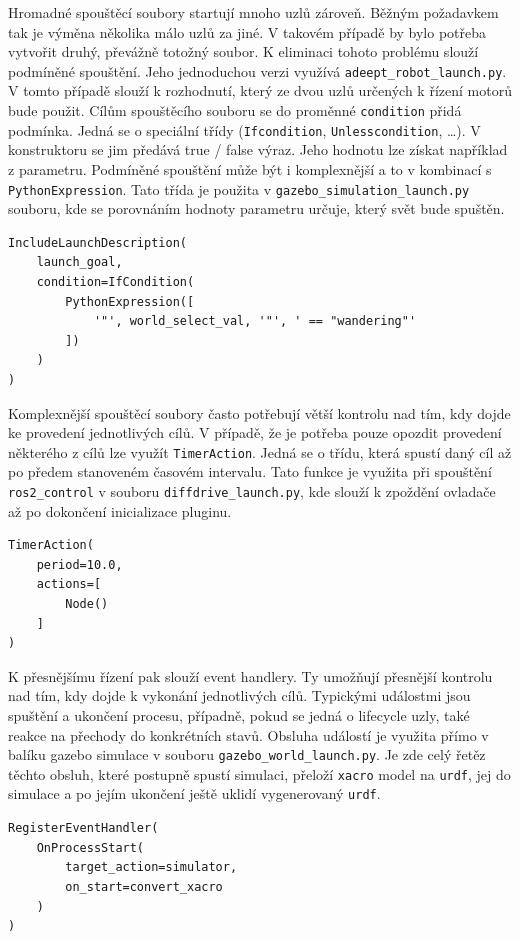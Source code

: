 Hromadné spouštěcí soubory startují mnoho uzlů zároveň. Běžným požadavkem tak je výměna několika málo uzlů za jiné. V takovém případě by bylo potřeba vytvořit druhý, převážně totožný soubor. K eliminaci tohoto problému slouží podmíněné spouštění. Jeho jednoduchou verzi využívá \verb|adeept_robot_launch.py|. V tomto případě slouží k rozhodnutí, který ze dvou uzlů určených k řízení motorů bude použit. Cílům spouštěcího souboru se do proměnné \verb|condition| přidá podmínka. Jedná se o speciální třídy (\verb|Ifcondition|, \verb|Unlesscondition|, \dots). V konstruktoru se jim předává true / false výraz. Jeho hodnotu lze získat například z parametru. Podmíněné spouštění může být i komplexnější a to v kombinací s \verb|PythonExpression|. Tato třída je použita v \verb|gazebo_simulation_launch.py| souboru, kde se porovnáním hodnoty parametru určuje, který svět bude spuštěn.
\begin{verbatim}
IncludeLaunchDescription(
    launch_goal,
    condition=IfCondition(
        PythonExpression([
            '"', world_select_val, '"', ' == "wandering"'
        ])
    )
)
\end{verbatim}

Komplexnější spouštěcí soubory často potřebují větší kontrolu nad tím, kdy dojde ke provedení jednotlivých cílů. V případě, že je potřeba pouze opozdit provedení některého z cílů lze využít \verb|TimerAction|. Jedná se o třídu, která spustí daný cíl až po předem stanoveném časovém intervalu. Tato funkce je využita při spouštění \verb|ros2_control| v souboru \verb|diffdrive_launch.py|, kde slouží k zpoždění  ovladače až po dokončení inicializace pluginu.
\begin{verbatim}
TimerAction(
    period=10.0,
    actions=[
        Node()
    ]
)
\end{verbatim}

K přesnějšímu řízení pak slouží event handlery. Ty umožňují přesnější kontrolu nad tím, kdy dojde k vykonání jednotlivých cílů. Typickými událostmi jsou spuštění a ukončení procesu, případně, pokud se jedná o lifecycle uzly, také reakce na přechody do konkrétních stavů. Obsluha událostí je využita přímo v balíku gazebo simulace v souboru \verb|gazebo_world_launch.py|. Je zde celý řetěz těchto obsluh, které postupně spustí simulaci, přeloží \verb|xacro| model na \verb|urdf|,  jej do simulace a po jejím ukončení ještě uklidí vygenerovaný \verb|urdf|.
\begin{verbatim}
RegisterEventHandler(
    OnProcessStart(
        target_action=simulator,
        on_start=convert_xacro
    )
)
\end{verbatim}

